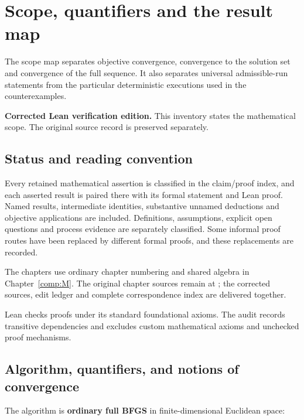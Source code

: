 \chapter{Scope, quantifiers and the result map}\label{comp:I}\label{I:chapter}
\renewcommand{\ModuleTag}{1}
The scope map separates objective convergence, convergence to the solution set and convergence of the full sequence. It also separates universal admissible-run statements from the particular deterministic executions used in the counterexamples.



\textbf{Corrected Lean verification edition.} This inventory states the mathematical scope. The original source record is preserved separately.

\section*{Status and reading convention}\label{status-and-reading-convention}


Every retained mathematical assertion is classified in the claim/proof index, and each asserted result is paired there with its formal statement and Lean proof. Named results, intermediate identities, substantive unnamed deductions and objective applications are included. Definitions, assumptions, explicit open questions and process evidence are separately classified. Some informal proof routes have been replaced by different formal proofs, and these replacements are recorded.

The chapters use ordinary chapter numbering and shared algebra in Chapter~\ref{comp:M}. The original chapter sources remain at ; the corrected sources, edit ledger and complete correspondence index are delivered together.

Lean checks proofs under its standard foundational axioms. The audit records transitive dependencies and excludes custom mathematical axioms and unchecked proof mechanisms.



\section{Algorithm, quantifiers, and notions of convergence}\label{algorithm-quantifiers-and-notions-of-convergence}

The algorithm is \textbf{ordinary full BFGS} in finite-dimensional Euclidean space:

